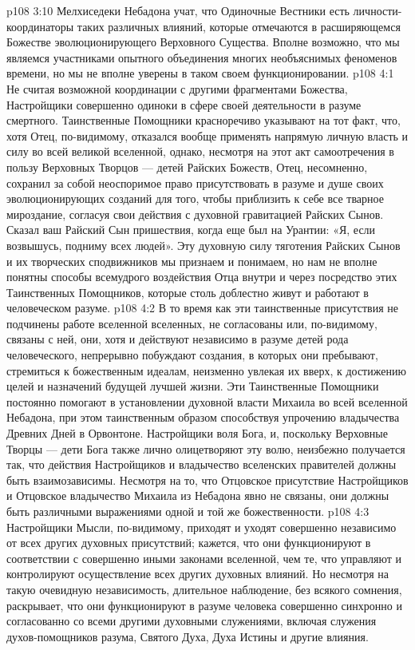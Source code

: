 \vs p108 3:10 Мелхиседеки Небадона учат, что Одиночные Вестники есть личности\hyp{}координаторы таких различных влияний, которые отмечаются в расширяющемся Божестве эволюционирующего Верховного Существа. Вполне возможно, что мы являемся участниками опытного объединения многих необъяснимых феноменов времени, но мы не вполне уверены в таком своем функционировании.
\vs p108 4:1 Не считая возможной координации с другими фрагментами Божества, Настройщики совершенно одиноки в сфере своей деятельности в разуме смертного. Таинственные Помощники красноречиво указывают на тот факт, что, хотя Отец, по\hyp{}видимому, отказался вообще применять напрямую личную власть и силу во всей великой вселенной, однако, несмотря на этот акт самоотречения в пользу Верховных Творцов --- детей Райских Божеств, Отец, несомненно, сохранил за собой неоспоримое право присутствовать в разуме и душе своих эволюционирующих созданий для того, чтобы приблизить к себе все тварное мироздание, согласуя свои действия с духовной гравитацией Райских Сынов. Сказал ваш Райский Сын пришествия, когда еще был на Урантии: «Я, если возвышусь, подниму всех людей». Эту духовную силу тяготения Райских Сынов и их творческих сподвижников мы признаем и понимаем, но нам не вполне понятны способы всемудрого воздействия Отца внутри и через посредство этих Таинственных Помощников, которые столь доблестно живут и работают в человеческом разуме.
\vs p108 4:2 В то время как эти таинственные присутствия не подчинены работе вселенной вселенных, не согласованы или, по\hyp{}видимому, связаны с ней, они, хотя и действуют независимо в разуме детей рода человеческого, непрерывно побуждают создания, в которых они пребывают, стремиться к божественным идеалам, неизменно увлекая их вверх, к достижению целей и назначений будущей лучшей жизни. Эти Таинственные Помощники постоянно помогают в установлении духовной власти Михаила во всей вселенной Небадона, при этом таинственным образом способствуя упрочению владычества Древних Дней в Орвонтоне. Настройщики  воля Бога, и, поскольку Верховные Творцы --- дети Бога также лично олицетворяют эту волю, неизбежно получается так, что действия Настройщиков и владычество вселенских правителей должны быть взаимозависимы. Несмотря на то, что Отцовское присутствие Настройщиков и Отцовское владычество Михаила из Небадона явно не связаны, они должны быть различными выражениями одной и той же божественности.
\vs p108 4:3 Настройщики Мысли, по\hyp{}видимому, приходят и уходят совершенно независимо от всех других духовных присутствий; кажется, что они функционируют в соответствии с совершенно иными законами вселенной, чем те, что управляют и контролируют осуществление всех других духовных влияний. Но несмотря на такую очевидную независимость, длительное наблюдение, без всякого сомнения, раскрывает, что они функционируют в разуме человека совершенно синхронно и согласованно со всеми другими духовными служениями, включая служения духов\hyp{}помощников разума, Святого Духа, Духа Истины и другие влияния.
